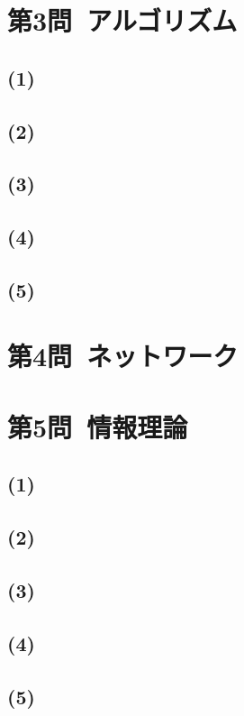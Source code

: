 \documentclass[a4paper,12pt,xelatex,ja=standard]{bxjsarticle}
\begin{document}
\section*{第3問\ アルゴリズム}
\subsection*{(1)}

\subsection*{(2)}

\subsection*{(3)}

\subsection*{(4)}

\subsection*{(5)}

\section*{第4問\ ネットワーク}

\section*{第5問\ 情報理論}
\subsection*{(1)}

\subsection*{(2)}

\subsection*{(3)}

\subsection*{(4)}

\subsection*{(5)}
\end{document}
